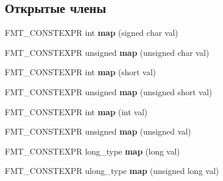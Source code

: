 \subsection*{Открытые члены}
\begin{DoxyCompactItemize}
\item 
\mbox{\label{structinternal_1_1arg__mapper_a78b1127e2f1b42591935a0e606539a60}} 
F\+M\+T\+\_\+\+C\+O\+N\+S\+T\+E\+X\+PR int {\bfseries map} (signed char val)
\item 
\mbox{\label{structinternal_1_1arg__mapper_a2d53af940b25524f766a088c03cdaf35}} 
F\+M\+T\+\_\+\+C\+O\+N\+S\+T\+E\+X\+PR unsigned {\bfseries map} (unsigned char val)
\item 
\mbox{\label{structinternal_1_1arg__mapper_a442bbf6a91ddd1a828c87e0ae64d7bb9}} 
F\+M\+T\+\_\+\+C\+O\+N\+S\+T\+E\+X\+PR int {\bfseries map} (short val)
\item 
\mbox{\label{structinternal_1_1arg__mapper_a9b3c01a353b92f562a213448c09cdba8}} 
F\+M\+T\+\_\+\+C\+O\+N\+S\+T\+E\+X\+PR unsigned {\bfseries map} (unsigned short val)
\item 
\mbox{\label{structinternal_1_1arg__mapper_aa9bc80fe4a295a82e9606c76bafb4fad}} 
F\+M\+T\+\_\+\+C\+O\+N\+S\+T\+E\+X\+PR int {\bfseries map} (int val)
\item 
\mbox{\label{structinternal_1_1arg__mapper_a8962faba7471960b4c7642c24d9e5883}} 
F\+M\+T\+\_\+\+C\+O\+N\+S\+T\+E\+X\+PR unsigned {\bfseries map} (unsigned val)
\item 
\mbox{\label{structinternal_1_1arg__mapper_a3b07ea1a0cda9a03d197c439ce79774c}} 
F\+M\+T\+\_\+\+C\+O\+N\+S\+T\+E\+X\+PR long\+\_\+type {\bfseries map} (long val)
\item 
\mbox{\label{structinternal_1_1arg__mapper_afc4cef9181b4291e8d8329d12ffd7d9b}} 
F\+M\+T\+\_\+\+C\+O\+N\+S\+T\+E\+X\+PR ulong\+\_\+type {\bfseries map} (unsigned long val)
\item 
\mbox{\label{structinternal_1_1arg__mapper_a8e6d894cdc99de72949e4748fa7e2cac}} 

\end{DoxyCompactItemize}
